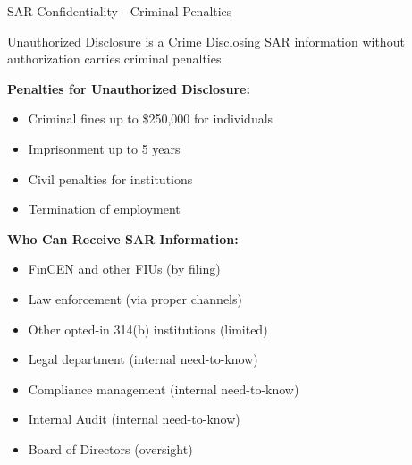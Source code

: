\documentclass[11pt,a4paper]{beamer}
\begin{document}
	\begin{frame}{SAR Confidentiality - Criminal Penalties}
		\begin{block}{Unauthorized Disclosure is a Crime}
			Disclosing SAR information without authorization carries criminal penalties.
		\end{block}
		\textbf{Penalties for Unauthorized Disclosure:}
		\begin{itemize}
			\item Criminal fines up to \$250,000 for individuals
			\item Imprisonment up to 5 years
			\item Civil penalties for institutions
			\item Termination of employment
		\end{itemize}
		\textbf{Who Can Receive SAR Information:}
		\begin{itemize}
			\item FinCEN and other FIUs (by filing)
			\item Law enforcement (via proper channels)
			\item Other opted-in 314(b) institutions (limited)
			\item Legal department (internal need-to-know)
			\item Compliance management (internal need-to-know)
			\item Internal Audit (internal need-to-know)
			\item Board of Directors (oversight)
		\end{itemize}
	\end{frame}
	
	
\end{document}
